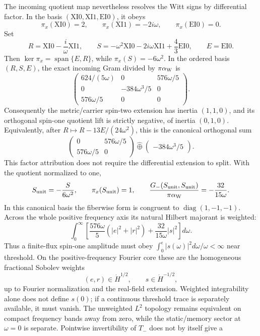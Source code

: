 \documentclass[11pt]{article}
\theoremstyle{definition}
\theoremstyle{remark}
\begin{document}
The incoming quotient map nevertheless resolves the Witt signs by
differential factor.  In the basis
\((\mathrm{XI0},\mathrm{XI1},\mathrm{EI0})\), it obeys
\[
 \pi_x(\mathrm{XI0})=2,\qquad
 \pi_x(\mathrm{XI1})=-2i\omega,\qquad
 \pi_x(\mathrm{EI0})=0.
\]
Set
\[
 R=\mathrm{XI0}-\frac{i}{\omega}\mathrm{XI1},\qquad
 S=-\omega^2\mathrm{XI0}-2i\omega\mathrm{XI1}
   +\frac43\mathrm{EI0},\qquad E=\mathrm{EI0}.
\]
Then \(\ker\pi_x=\operatorname{span}\{E,R\}\), while
\(\pi_x(S)=-6\omega^2\).  In the ordered basis \((R,S,E)\), the exact
incoming Gram divided by \(\pi\alpha_{\rm W}\) is
\[
 \begin{pmatrix}
  624/(5\omega)&0&576\omega/5\\
  0&-384\omega^3/5&0\\
  576\omega/5&0&0
 \end{pmatrix}.
\]
Consequently the metric/carrier spin-two extension has inertia
\((1,1,0)\), and its orthogonal spin-one quotient lift is strictly
negative, of inertia \((0,1,0)\).  Equivalently, after
\(R\mapsto R-13E/(24\omega^2)\), this is the canonical orthogonal sum
\[
 \begin{pmatrix}0&576\omega/5\\576\omega/5&0\end{pmatrix}
 \widehat\oplus
 \begin{pmatrix}-384\omega^3/5\end{pmatrix}.
\]
This factor attribution does not require the differential extension to
split.  With the quotient normalized to one,
\[
 S_{\rm unit}=-\frac{S}{6\omega^2},\qquad
 \pi_x(S_{\rm unit})=1,\qquad
 \frac{G_-(S_{\rm unit},S_{\rm unit})}{\pi\alpha_{\rm W}}
 =-\frac{32}{15\omega}.
\]
In this canonical basis the fiberwise form is congruent to
\(\operatorname{diag}(1,-1,-1)\).  Across the whole positive frequency
axis its natural Hilbert majorant is weighted:
\[
 \int_0^\infty\left[
 \frac{576\omega}{5}(|e|^2+|r|^2)
 +\frac{32}{15\omega}|s|^2
 \right]d\omega.
\]
Thus a finite-flux spin-one amplitude must obey
\(\int_0^\epsilon |s(\omega)|^2d\omega/\omega<\infty\) near threshold.
On the positive-frequency Fourier core these are the homogeneous fractional
Sobolev weights
\[
 (e,r)\in\dot H^{1/2},\qquad s\in\dot H^{-1/2},
\]
up to Fourier normalization and the real-field extension.  Weighted
integrability alone does not define \(s(0)\); if a continuous threshold trace
is separately available, it must vanish.
The unweighted \(L^2\) topology remains equivalent on compact frequency
bands away from zero, while the static/memory sector at \(\omega=0\) is
separate.  Pointwise invertibility of \(T_-\) does not by itself give a
\end{document}
